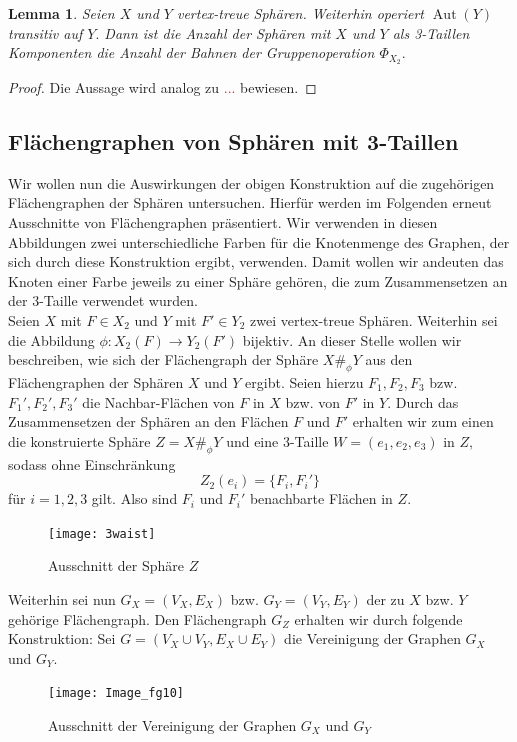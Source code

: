 \documentclass[12pt,titlepage,twoside,cleardoublepage]{article}
\theoremstyle{nummermitklammern}
\newtheorem{lemma}[temp]{Lemma}
\newtheorem{lemma}[zahl]{Lemma}
\numberwithin{equation}{section}
\DeclareMathOperator{\Aut}{Aut}
\begin{document}
\begin{lemma}
Seien $X$ und $Y$ vertex-treue Sphären. Weiterhin operiert $\Aut(Y)$ transitiv auf $Y.$ Dann ist die Anzahl der Sphären mit $X$ und $Y$ als 3-Taillen Komponenten die Anzahl der Bahnen der Gruppenoperation $\Phi_{X_2}.$
\end{lemma}
\begin{proof}
Die Aussage wird analog zu \textcolor{red}{...} bewiesen.
\end{proof}
\subsection{Flächengraphen von Sphären mit 3-Taillen}
Wir wollen nun die Auswirkungen der obigen Konstruktion auf die zugehörigen Flächengraphen der Sphären untersuchen.
Hierfür werden im Folgenden erneut Ausschnitte von Flächengraphen präsentiert. Wir verwenden in diesen Abbildungen zwei unterschiedliche Farben für die Knotenmenge des Graphen, der sich durch diese Konstruktion ergibt, verwenden. Damit wollen wir andeuten das Knoten einer Farbe jeweils zu einer Sphäre gehören, die zum Zusammensetzen an der 3-Taille verwendet wurden.\\
Seien $X$ mit $F\in X_2$ und $Y$ mit $F'\in Y_2$ zwei vertex-treue Sphären. Weiterhin sei die Abbildung $\phi:X_2(F)\to Y_2(F')$ bijektiv. An dieser Stelle wollen wir beschreiben, wie sich der Flächengraph der Sphäre $X\#_{\phi}Y$ aus den Flächengraphen der Sphären $X$ und $Y$ ergibt. Seien hierzu $F_1,F_2,F_3$ bzw. $F_1',F_2',F_3'$ die Nachbar-Flächen von $F$ in $X$ bzw. von $F'$ in $Y.$ Durch das Zusammensetzen der Sphären an den Flächen $F$ und $F'$ erhalten wir zum einen die konstruierte Sphäre $Z=X \#_\phi Y$ und eine 3-Taille $W=(e_1,e_2,e_3)$ in $Z,$ sodass ohne Einschränkung 
\[
Z_2(e_i)=\{F_i,F_i'\}
\] für $i=1,2,3$ gilt. Also sind $F_i$ und $F_i'$ benachbarte Flächen in $Z$.
\begin{figure}[H]
\begin{center}
\texttt{[image: 3waist]}
\end{center}
\caption{Ausschnitt der Sphäre $Z$}
\end{figure}   
 Weiterhin sei nun $G_X=(V_X,E_X)$ bzw. $G_Y=(V_Y,E_Y)$ der zu $X$ bzw. $Y$ gehörige Flächengraph. Den Flächengraph $G_Z$ erhalten wir durch folgende Konstruktion:
Sei $G=(V_X\cup V_Y,E_X \cup E_Y)$ die Vereinigung der Graphen $G_X$ und $G_Y.$
\begin{figure}[H]
\begin{center}
\texttt{[image: Image\_fg10]}
\end{center}
\caption{Ausschnitt der Vereinigung der Graphen $G_X$ und $G_Y$}
\end{figure}
\end{document}

